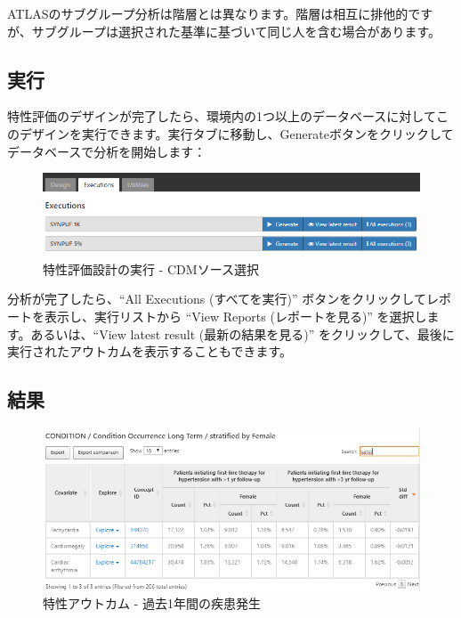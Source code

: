 \documentclass[
  11pt]{book}
\makeatletter
\newenvironment{kframe}{%
\medskip{}
\setlength{\fboxsep}{.8em}
 \def\at@end@of@kframe{}%
 \ifinner\ifhmode%
  \def\at@end@of@kframe{\end{minipage}}%
  \begin{minipage}{\columnwidth}%
 \fi\fi%
 \def\FrameCommand##1{\hskip\@totalleftmargin \hskip-\fboxsep
 \colorbox{myShadeColor}{##1}\hskip-\fboxsep
     \hskip-\linewidth \hskip-\@totalleftmargin \hskip\columnwidth}%
 \MakeFramed {\advance\hsize-\width
   \@totalleftmargin\z@ \linewidth\hsize
   \@setminipage}}%
 {\par\unskip\endMakeFramed%
 \at@end@of@kframe}
\newenvironment{rmdblock}[1]
  {
  \begin{itemize}
  \renewcommand{\labelitemi}{
    \raisebox{-.7\height}[0pt][0pt]{
      {\setkeys{Gin}{width=3em,keepaspectratio}\texttt{[image: images/\#1]}}
    }
  }
  \setlength{\fboxsep}{1em}
  \begin{kframe}
  \item
  }
  {
  \end{kframe}
  \end{itemize}
  }
\newenvironment{rmdimportant}
  {\begin{rmdblock}{important}}
  {\end{rmdblock}}
\theoremstyle{definition}
\theoremstyle{definition}
\theoremstyle{definition}
\theoremstyle{definition}
\theoremstyle{remark}
\makeatother
\begin{document}
\begin{rmdimportant}
ATLASのサブグループ分析は階層とは異なります。階層は相互に排他的ですが、サブグループは選択された基準に基づいて同じ人を含む場合があります。
\end{rmdimportant}

\subsection{実行}\label{ux5b9fux884c}

特性評価のデザインが完了したら、環境内の1つ以上のデータベースに対してこのデザインを実行できます。実行タブに移動し、Generateボタンをクリックしてデータベースで分析を開始します：

\begin{figure}

{\centering \includegraphics[width=1\linewidth]{images/Characterization/atlasCharacterizationExecutions} 

}

\caption{特性評価設計の実行 - CDMソース選択}\label{fig:atlasCharacterizationExecutions}
\end{figure}

分析が完了したら、``All Executions (すべてを実行)'' ボタンをクリックしてレポートを表示し、実行リストから ``View Reports (レポートを見る)'' を選択します。あるいは、``View latest result (最新の結果を見る)'' をクリックして、最後に実行されたアウトカムを表示することもできます。

\subsection{結果}\label{ux7d50ux679c}

\begin{figure}

{\centering \includegraphics[width=1\linewidth]{images/Characterization/atlasCharacterizationResultsSummary} 

}

\caption{特性アウトカム - 過去1年間の疾患発生}\label{fig:atlasCharacterizationResultsSummary}
\end{figure}
\end{document}
